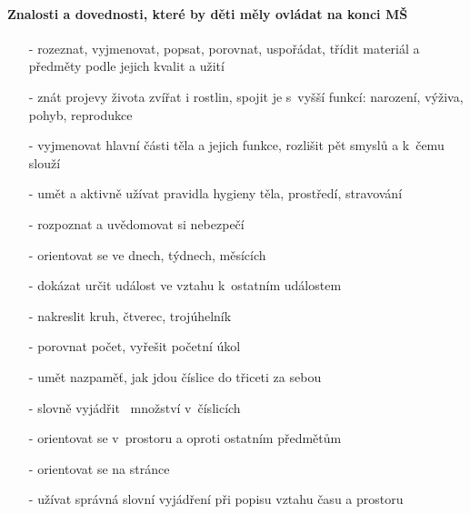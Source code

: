 			\paragraph{Znalosti a dovednosti, které by děti měly ovládat na konci MŠ}
				\vspace{-2mm}
				\begin{itemize}
					\setlength\itemsep{-2mm}
					\item[-] rozeznat, vyjmenovat, popsat, porovnat, uspořádat, třídit materiál a předměty podle jejich kvalit a užití
					\item[-] znát projevy života zvířat i rostlin, spojit je s vyšší funkcí: narození, výživa, pohyb, reprodukce
					\item[-] vyjmenovat hlavní části těla a jejich funkce, rozlišit pět smyslů a k čemu slouží
					\item[-] umět a aktivně užívat pravidla hygieny těla, prostředí, stravování
					\item[-] rozpoznat a uvědomovat si nebezpečí
					\item[-] orientovat se ve dnech, týdnech, měsících
					\item[-] dokázat určit událost ve vztahu k ostatním událostem
					\item[-] nakreslit kruh, čtverec, trojúhelník
					\item[-] porovnat počet, vyřešit početní úkol
					\item[-] umět nazpaměť, jak jdou číslice do třiceti za sebou 
					\item[-] slovně vyjádřit  množství v~číslicích 
					\item[-] orientovat se v prostoru a oproti ostatním předmětům
					\item[-] orientovat se na stránce
					\item[-] užívat správná slovní vyjádření při popisu vztahu času a prostoru
				\end{itemize}

